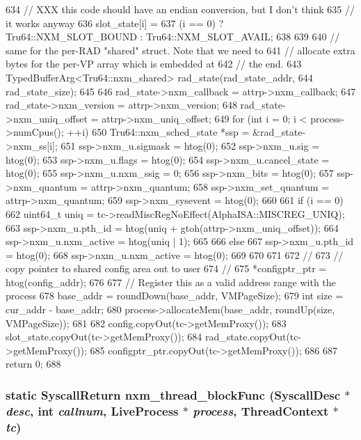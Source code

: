 \begin{DoxyCode}
{{634             // XXX this code should have an endian conversion, but I don't think
635             // it works anyway
636             slot_state[i] =
637                 (i == 0) ? Tru64::NXM_SLOT_BOUND : Tru64::NXM_SLOT_AVAIL;
638         }
639 
640         // same for the per-RAD "shared" struct.  Note that we need to
641         // allocate extra bytes for the per-VP array which is embedded at
642         // the end.
643         TypedBufferArg<Tru64::nxm_shared> rad_state(rad_state_addr,
644                                                     rad_state_size);
645 
646         rad_state->nxm_callback = attrp->nxm_callback;
647         rad_state->nxm_version = attrp->nxm_version;
648         rad_state->nxm_uniq_offset = attrp->nxm_uniq_offset;
649         for (int i = 0; i < process->numCpus(); ++i) {
650             Tru64::nxm_sched_state *ssp = &rad_state->nxm_ss[i];
651             ssp->nxm_u.sigmask = htog(0);
652             ssp->nxm_u.sig = htog(0);
653             ssp->nxm_u.flags = htog(0);
654             ssp->nxm_u.cancel_state = htog(0);
655             ssp->nxm_u.nxm_ssig = 0;
656             ssp->nxm_bits = htog(0);
657             ssp->nxm_quantum = attrp->nxm_quantum;
658             ssp->nxm_set_quantum = attrp->nxm_quantum;
659             ssp->nxm_sysevent = htog(0);
660 
661             if (i == 0) {
662                 uint64_t uniq = tc->readMiscRegNoEffect(AlphaISA::MISCREG_UNIQ);
663                 ssp->nxm_u.pth_id = htog(uniq + gtoh(attrp->nxm_uniq_offset));
664                 ssp->nxm_u.nxm_active = htog(uniq | 1);
665             }
666             else {
667                 ssp->nxm_u.pth_id = htog(0);
668                 ssp->nxm_u.nxm_active = htog(0);
669             }
670         }
671 
672         //
673         // copy pointer to shared config area out to user
674         //
675         *configptr_ptr = htog(config_addr);
676 
677         // Register this as a valid address range with the process
678         base_addr = roundDown(base_addr, VMPageSize);
679         int size = cur_addr - base_addr;
680         process->allocateMem(base_addr, roundUp(size, VMPageSize));
681 
682         config.copyOut(tc->getMemProxy());
683         slot_state.copyOut(tc->getMemProxy());
684         rad_state.copyOut(tc->getMemProxy());
685         configptr_ptr.copyOut(tc->getMemProxy());
686 
687         return 0;
688     }
\end{DoxyCode}
\hypertarget{classTru64_a05e8a076d0c534c96b680a3661fc9003}{
\subsubsection[{nxm\_\-thread\_\-blockFunc}]{\setlength{\rightskip}{0pt plus 5cm}static {\bf SyscallReturn} nxm\_\-thread\_\-blockFunc ({\bf SyscallDesc} $\ast$ {\em desc}, \/  int {\em callnum}, \/  {\bf LiveProcess} $\ast$ {\em process}, \/  {\bf ThreadContext} $\ast$ {\em tc})}}
\label{classTru64_a05e8a076d0c534c96b680a3661fc9003}


